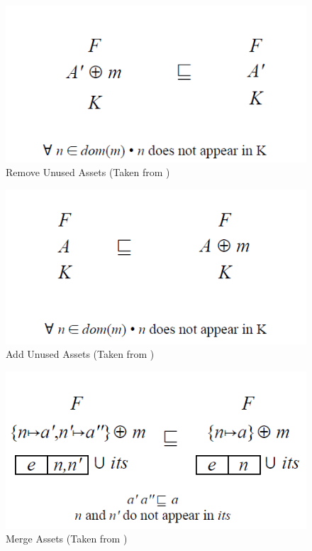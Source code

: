 \documentclass[12pt]{article}
\begin{document}
\begin{figure}[H]
\centering
\includegraphics[width=1\textwidth, frame]{images/RemoveUnusedAssets}
\caption{Remove Unused Assets (Taken from \cite{phdlmt})}
\end{figure}

\begin{figure}[H]
\centering
\includegraphics[width=1\textwidth, frame]{images/AddUnusedAssets}
\caption{Add Unused Assets (Taken from \cite{phdlmt})}
\end{figure}

\begin{figure}[H]
\centering
\includegraphics[width=1\textwidth, frame]{images/MergeAssets}
\caption{Merge Assets (Taken from \cite{phdlmt})}
\end{figure}
\end{document}
